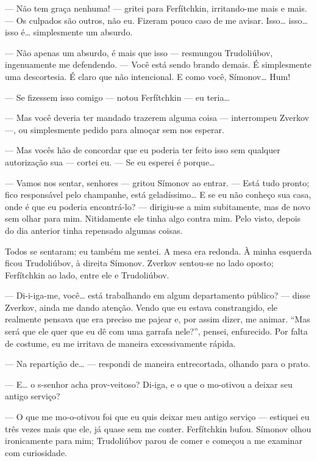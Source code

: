 --- Não tem graça nenhuma! --- gritei para Ferfítchkin, irritando-me mais e
mais. --- Os culpados são outros, não eu. Fizeram pouco caso de me
avisar. Isso\ldots{} isso\ldots{} isso é\ldots{} simplesmente um absurdo.

--- Não apenas um absurdo, é mais que isso --- resmungou Trudoliúbov,
ingenuamente me defendendo. --- Você está sendo brando demais. É
simplesmente uma descortesia. É claro que não intencional. E como você,
Símonov\ldots{} Hum!

--- Se fizessem isso comigo --- notou Ferfítchkin --- eu teria\ldots{}

--- Mas você deveria ter mandado trazerem alguma coisa --- interrompeu
Zverkov ---, ou simplesmente pedido para almoçar sem nos esperar.

--- Mas vocês hão de concordar que eu poderia ter feito isso sem qualquer
autorização sua --- cortei eu. --- Se eu esperei é porque\ldots{}

--- Vamos nos sentar, senhores --- gritou Símonov ao entrar. --- Está tudo
pronto; fico responsável pelo champanhe, está geladíssimo\ldots{} E se eu
não conheço sua casa, onde é que eu poderia encontrá-lo? --- dirigiu-se
a mim subitamente, mas de novo sem olhar para mim. Nitidamente ele
tinha algo contra mim. Pelo visto, depois do dia anterior tinha
repensado algumas coisas.

Todos se sentaram; eu também me sentei. A mesa era redonda. À minha
esquerda ficou Trudoliúbov, à direita Símonov. Zverkov sentou-se no
lado oposto; Ferfítchkin ao lado, entre ele e Trudoliúbov.

--- Di-i-iga-me, você\ldots{} está trabalhando em algum departamento público? ---
disse Zverkov, ainda me dando atenção. Vendo que eu estava
constrangido, ele realmente pensava que era preciso me pajear e, por
assim dizer, me animar. “Mas será que ele quer que eu dê com uma
garrafa nele?”, pensei, enfurecido. Por falta de costume, eu me
irritava de maneira excessivamente rápida.

--- Na repartição de\ldots{} --- respondi de maneira entrecortada, olhando para o
prato.

--- E\ldots{} o s-senhor acha prov-veitoso? Di-iga, e o que o mo-otivou a
deixar seu antigo serviço?

--- O que me mo-o-otivou foi que eu quis deixar meu antigo serviço ---
estiquei eu três vezes mais que ele, já quase sem me conter.
Ferfítchkin bufou. Símonov olhou ironicamente para mim; Trudoliúbov
parou de comer e começou a me examinar com curiosidade.


